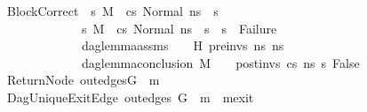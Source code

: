 \begin{isabellebody}
\ \ \ BlockCorrect{\isacharcolon}{\kern0pt}\ {\isachardoublequoteopen}{\isasymAnd}\ s{}{\isacharprime}{\kern0pt}{\isacharprime}{\kern0pt}{\isachardot}{\kern0pt}\ M{\isacharcomma}{\kern0pt}{\isasymLambda}{\isacharcomma}{\kern0pt}{\isasymGamma}{\isacharcomma}{\kern0pt}{\isasymOmega}\ {\isasymturnstile}\ {\isasymlangle}cs{}{\isacharcomma}{\kern0pt}\ Normal\ ns{}{\isasymrangle}\ {\isacharbrackleft}{\kern0pt}{\isasymrightarrow}{\isacharbrackright}{\kern0pt}\ s{}{\isacharprime}{\kern0pt}{\isacharprime}{\kern0pt}\ {\isasymLongrightarrow}\isanewline
\ \ \ \ \ \ \ \ \ \ \ \ \ \ \ {\isacharparenleft}{\kern0pt}{\isasymAnd}s{}{\isacharprime}{\kern0pt}{\isachardot}{\kern0pt}\ {\isacharparenleft}{\kern0pt}M{\isacharcomma}{\kern0pt}{\isasymLambda}{\isacharcomma}{\kern0pt}{\isasymGamma}{\isacharcomma}{\kern0pt}{\isasymOmega}\ {\isasymturnstile}\ {\isasymlangle}cs{}{\isacharcomma}{\kern0pt}\ Normal\ ns{}{\isasymrangle}\ {\isacharbrackleft}{\kern0pt}{\isasymrightarrow}{\isacharbrackright}{\kern0pt}\ s{}{\isacharprime}{\kern0pt}{\isacharparenright}{\kern0pt}\ {\isasymLongrightarrow}\ s{}{\isacharprime}{\kern0pt}\ {\isasymnoteq}\ Failure{\isacharparenright}{\kern0pt}\ {\isasymLongrightarrow}\isanewline
\ \ \ \ \ \ \ \ \ \ \ \ \ \ \ dag{\isacharunderscore}{\kern0pt}lemma{\isacharunderscore}{\kern0pt}assms\ {\isasymLambda}\ {\isasymGamma}\ {\isasymOmega}\ H\ pre{\isacharunderscore}{\kern0pt}invs\ ns{}\ ns{}\ \ {\isasymLongrightarrow}\ \ \ \ \ \ \isanewline
\ \ \ \ \ \ \ \ \ \ \ \ \ \ \ dag{\isacharunderscore}{\kern0pt}lemma{\isacharunderscore}{\kern0pt}conclusion\ M\ {\isasymLambda}\ {\isasymGamma}\ {\isasymOmega}\ post{\isacharunderscore}{\kern0pt}invs\ cs{}\ ns{}\ s{}{\isacharprime}{\kern0pt}{\isacharprime}{\kern0pt}\ False{\isachardoublequoteclose}\ \isanewline
\ \ \ ReturnNode{\isacharcolon}{\kern0pt}\ {\isachardoublequoteopen}out{\isacharunderscore}{\kern0pt}edges{\isacharparenleft}{\kern0pt}G{}{\isacharparenright}{\kern0pt}\ {\isacharbang}{\kern0pt}\ m{}\ {\isacharequal}{\kern0pt}\ {\isacharbrackleft}{\kern0pt}{\isacharbrackright}{\kern0pt}{\isachardoublequoteclose}\ \isanewline
\ \ \ DagUniqueExitEdge{\isacharcolon}{\kern0pt}\ {\isachardoublequoteopen}out{\isacharunderscore}{\kern0pt}edges\ {\isacharparenleft}{\kern0pt}G{}{\isacharparenright}{\kern0pt}\ {\isacharbang}{\kern0pt}\ m{}\ {\isacharequal}{\kern0pt}\ {\isacharbrackleft}{\kern0pt}m{}{\isacharunderscore}{\kern0pt}exit{\isacharbrackright}{\kern0pt}{\isachardoublequoteclose}\ \isanewline

\end{isabellebody}
